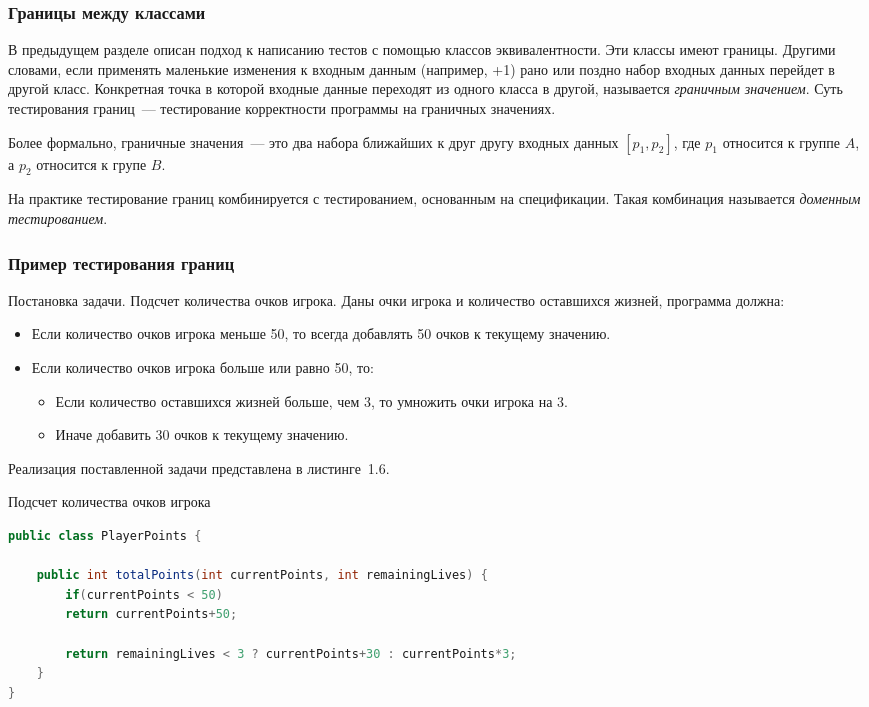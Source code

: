 \subsubsection{Границы между классами} 

В предыдущем разделе описан подход к написанию тестов с помощью классов эквивалентности. Эти классы имеют границы. Другими словами, если применять маленькие изменения к входным данным (например, +1) рано или поздно набор входных данных перейдет в другой класс. Конкретная точка в которой входные данные переходят из одного класса в другой, называется \textit{граничным значением}. Суть тестирования границ~--- тестирование корректности программы на граничных значениях. 

Более формально, граничные значения~--- это два набора ближайших к друг другу входных данных \([p_1, p_2]\), где \(p_1\) относится к группе \(A\), а \(p_2\) относится к групе \(B\).
 
На практике тестирование границ комбинируется с тестированием, основанным на спецификации. Такая комбинация называется \textit{доменным тестированием}.
 
\subsubsection{Пример тестирования границ} 

Постановка задачи. Подсчет количества очков игрока. Даны очки игрока и количество оставшихся жизней, программа должна:

\begin{itemize}
	\item Если количество очков игрока меньше 50, то всегда добавлять 50 очков к текущему значению.
	\item Если количество очков игрока больше или равно 50, то:
	\begin{itemize}
		\item Если количество оставшихся жизней больше, чем 3, то умножить очки игрока на 3.
		\item Иначе добавить 30 очков к текущему значению.
	\end{itemize}
\end{itemize}

Реализация поставленной задачи представлена в листинге~1.6.

\begin{ListingEnv}[!h]%
	\captiondelim{ } %
	\caption{Подсчет количества очков игрока}
	\begin{lstlisting}[language={Java}]
public class PlayerPoints {
	
	public int totalPoints(int currentPoints, int remainingLives) {
		if(currentPoints < 50)
		return currentPoints+50;
		
		return remainingLives < 3 ? currentPoints+30 : currentPoints*3;
	}
}
	\end{lstlisting}
\end{ListingEnv}%

